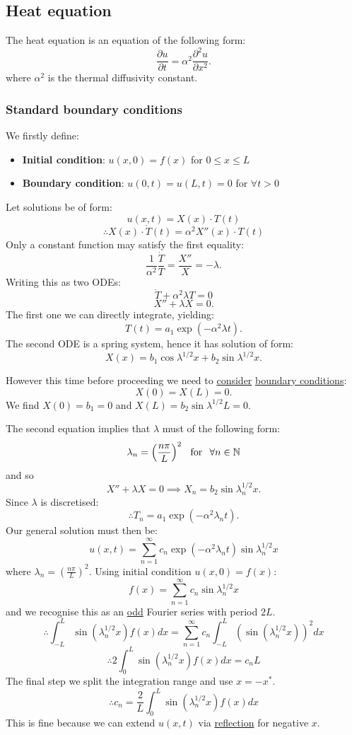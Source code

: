 \documentclass{article}
\begin{document}
\subsection{Heat equation}
The heat equation is an equation of the following form:
$$\frac{\partial u}{\partial t}=\alpha^2\frac{\partial^2 u}{\partial x^2}.$$
where $\alpha^2$ is the thermal diffusivity constant. 

\subsubsection{Standard boundary conditions}
We firstly define:
\begin{itemize}
    \item \textbf{Initial condition}: $u(x,0)=f(x)$ for $0\leq x\leq L$

    \item \textbf{Boundary condition}: $u(0,t)=u(L,t)=0$ for $\forall t>0$
\end{itemize}
Let solutions be of form:
$$u(x,t)=X(x)\cdot T(t)$$
$$\therefore X(x)\cdot \dot{T}(t)=\alpha^2 X''(x)\cdot T(t)$$
Only a constant function may satisfy the first equality:
$$\frac{1}{\alpha^2}\frac{\dot{T}}{T}=\frac{X''}{X}=-\lambda.$$
Writing this as two ODEs:
$$\dot{T}+\alpha^2\lambda T=0$$
$$X''+\lambda X=0.$$
The first one we can directly integrate, yielding:
$$T(t)=a_1\exp\left(-\alpha^2\lambda t\right).$$
The second ODE is a spring system, hence it has solution of form:
$$X(x)=b_1\cos\lambda^{1/2} x+b_2\sin\lambda^{1/2} x.$$

\newpage

However this time before proceeding we need to \underline{consider}
\underline{boundary conditions}:
$$X(0)=X(L)=0.$$
We find $X(0)=b_1=0$ and $X(L)=b_2\sin\lambda^{1/2} L=0$.

The second equation implies that $\lambda$ must of the following form:
$$\lambda_n=\left(\frac{n\pi}{L}\right)^2
\hspace{0.1in}\text{for}\hspace{0.1in}\forall n\in\mathbb{N}$$
and so
$$X''+\lambda X=0\implies X_n=b_2\sin\lambda_n^{1/2} x.$$
Since $\lambda$ is discretised:
$$\therefore T_n=a_1\exp\left(-\alpha^2\lambda_n t\right).$$
Our general solution must then be:
$$u(x,t)=\sum_{n=1}^{\infty}c_n\exp\left(-\alpha^2\lambda_n t\right)
\sin\lambda_n^{1/2} x$$
where $\lambda_n=\left(\frac{n\pi}{L}\right)^2$. Using initial condition $u(x,0)=f(x)$:
$$f(x)=\sum_{n=1}^{\infty}c_n\sin\lambda_n^{1/2} x$$
and we recognise this as an \underline{odd} Fourier series with period $2L$.
$$\therefore\int_{-L}^{L}\sin(\lambda_n^{1/2} x) f(x)dx=\sum_{n=1}^{\infty}c_n\int_{-L}^{L}\left(
\sin(\lambda_n^{1/2} x)\right)^2dx$$
$$\therefore2\int_{0}^{L}\sin(\lambda_n^{1/2} x) f(x)dx
=c_n L$$
The final step we split the integration range and use $x=-x^*$.
$$\therefore c_n=\frac{2}{L}\int_{0}^{L}\sin(\lambda_n^{1/2} x) f(x)dx$$
This is fine because we can extend $u(x,t)$ via \underline{reflection} for negative $x$.
\end{document}
